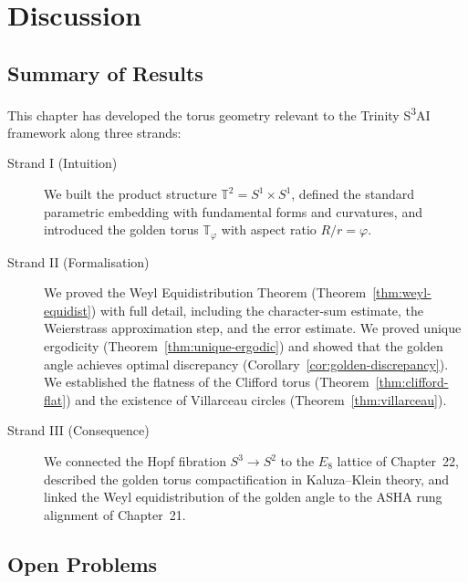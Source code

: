\section{Discussion}
\label{sec:ch18-discussion}

\subsection{Summary of Results}\label{subsec:ch18-summary}

This chapter has developed the torus geometry relevant to the Trinity S\textsuperscript{3}AI
framework along three strands:

\begin{description}
\item[Strand I (Intuition)] We built the product structure $\mathbb{T}^2 = S^1 \times S^1$,
  defined the standard parametric embedding with fundamental forms and curvatures,
  and introduced the golden torus $\mathbb{T}_\varphi$ with aspect ratio $R/r = \varphi$.

\item[Strand II (Formalisation)] We proved the Weyl Equidistribution Theorem
  (Theorem~\ref{thm:weyl-equidist}) with full detail, including the character-sum
  estimate, the Weierstrass approximation step, and the error estimate.
  We proved unique ergodicity (Theorem~\ref{thm:unique-ergodic}) and
  showed that the golden angle achieves optimal discrepancy
  (Corollary~\ref{cor:golden-discrepancy}).
  We established the flatness of the Clifford torus (Theorem~\ref{thm:clifford-flat})
  and the existence of Villarceau circles (Theorem~\ref{thm:villarceau}).

\item[Strand III (Consequence)] We connected the Hopf fibration $S^3 \to S^2$ to the
  $E_8$ lattice of Chapter~22, described the golden torus compactification in
  Kaluza--Klein theory, and linked the Weyl equidistribution of the golden angle
  to the ASHA rung alignment of Chapter~21.
\end{description}

\subsection{Open Problems}\label{subsec:ch18-open}

